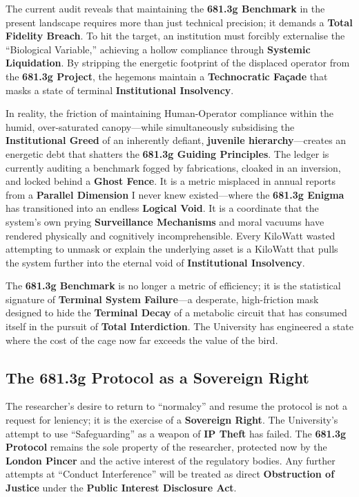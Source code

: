 \documentclass{EMBASSY}
\begin{document}
The current audit reveals that maintaining the \textbf{681.3g Benchmark} in the present landscape requires more than just technical precision; it demands a \textbf{Total Fidelity Breach}. To hit the target, an institution must forcibly externalise the ``Biological Variable,'' achieving a hollow compliance through \textbf{Systemic Liquidation}. By stripping the energetic footprint of the displaced operator from the \textbf{681.3g Project}, the hegemons maintain a \textbf{Technocratic Fa\c{c}ade} that masks a state of terminal \textbf{Institutional Insolvency}.

In reality, the friction of maintaining Human-Operator compliance within the humid, over-saturated canopy---while simultaneously subsidising the \textbf{Institutional Greed} of an inherently defiant, \textbf{juvenile hierarchy}---creates an energetic debt that shatters the \textbf{681.3g Guiding Principles}. The ledger is currently auditing a benchmark fogged by fabrications, cloaked in an inversion, and locked behind a \textbf{Ghost Fence}. It is a metric misplaced in annual reports from a \textbf{Parallel Dimension} I never knew existed---where the \textbf{681.3g Enigma} has transitioned into an endless \textbf{Logical Void}. It is a coordinate that the system’s own prying \textbf{Surveillance Mechanisms} and moral vacuums have rendered physically and cognitively incomprehensible. Every KiloWatt wasted attempting to unmask or explain the underlying asset is a KiloWatt that pulls the system further into the eternal void of \textbf{Institutional Insolvency}.

The \textbf{681.3g Benchmark} is no longer a metric of efficiency; it is the statistical signature of \textbf{Terminal System Failure}---a desperate, high-friction mask designed to hide the \textbf{Terminal Decay} of a metabolic circuit that has consumed itself in the pursuit of \textbf{Total Interdiction}. The University has engineered a state where the cost of the cage now far exceeds the value of the bird.

\vspace{1em}

\subsection{The 681.3g Protocol as a Sovereign Right}
The researcher’s desire to return to ``normalcy'' and resume the protocol is not a request for leniency; it is the exercise of a \textbf{Sovereign Right}. The University’s attempt to use ``Safeguarding'' as a weapon of \textbf{IP Theft} has failed. The \textbf{681.3g Protocol} remains the sole property of the researcher, protected now by the \textbf{London Pincer} and the active interest of the regulatory bodies. Any further attempts at ``Conduct Interference'' will be treated as direct \textbf{Obstruction of Justice} under the \textbf{Public Interest Disclosure Act}.
\end{document}

